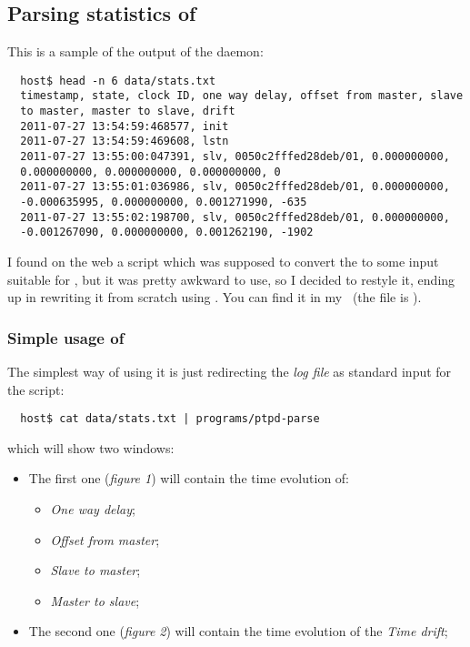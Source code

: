     \subsection{ Parsing statistics of \PTPd }

        This is a sample of the output of the daemon:
\begin{lstlisting}
  host$ head -n 6 data/stats.txt
  timestamp, state, clock ID, one way delay, offset from master, slave
  to master, master to slave, drift
  2011-07-27 13:54:59:468577, init
  2011-07-27 13:54:59:469608, lstn
  2011-07-27 13:55:00:047391, slv, 0050c2fffed28deb/01, 0.000000000,
  0.000000000, 0.000000000, 0.000000000, 0
  2011-07-27 13:55:01:036986, slv, 0050c2fffed28deb/01, 0.000000000,
  -0.000635995, 0.000000000, 0.001271990, -635
  2011-07-27 13:55:02:198700, slv, 0050c2fffed28deb/01, 0.000000000,
  -0.001267090, 0.000000000, 0.001262190, -1902
\end{lstlisting}

        I found on the web a  script which was supposed
        to convert the  to some input suitable for
        , but it was pretty awkward to use, so I decided
        to restyle it, ending up in rewriting it from scratch using
        . You can find it in my \MyRepo\ (the file is
        ).

\newpage
        \subsubsection{Simple usage of }

            The simplest way of using it is just redirecting the \emph{log
            file} as standard input for the script:
\begin{lstlisting}
  host$ cat data/stats.txt | programs/ptpd-parse
\end{lstlisting}
            which will show two windows:
            \begin{itemize}
            \item   The first one (\emph{figure 1}) will contain the time
                    evolution of:
                \begin{itemize}
                \item   \emph{One way delay};
                \item   \emph{Offset from master};
                \item   \emph{Slave to master};
                \item   \emph{Master to slave};
                \end{itemize}
            \item   The second one (\emph{figure 2}) will contain the time
                    evolution of the \emph{Time drift};
            \end{itemize}

